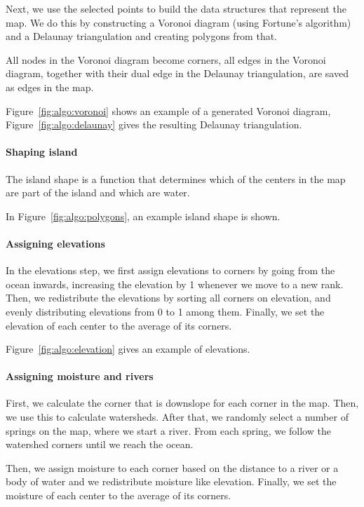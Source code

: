 Next, we use the selected points to build the data structures that represent the map.
We do this by constructing a Voronoi diagram (using Fortune's algorithm) and a Delaunay triangulation and creating polygons from that.

All nodes in the Voronoi diagram become corners, all edges in the Voronoi diagram, together with their dual edge in the Delaunay triangulation, are saved as edges in the map.

Figure~\ref{fig:algo:voronoi} shows an example of a generated Voronoi diagram, Figure~\ref{fig:algo:delaunay} gives the resulting Delaunay triangulation.

\paragraph{Shaping island}

The island shape is a function that determines which of the centers in the map are part of the island and which are water.

In Figure~\ref{fig:algo:polygons}, an example island shape is shown.

\paragraph{Assigning elevations}

In the elevations step, we first assign elevations to corners by going from the ocean inwards, increasing the elevation by 1 whenever we move to a new rank.
Then, we redistribute the elevations by sorting all corners on elevation, and evenly distributing elevations from 0 to 1 among them.
Finally, we set the elevation of each center to the average of its corners.

Figure~\ref{fig:algo:elevation} gives an example of elevations.

\paragraph{Assigning moisture and rivers}

First, we calculate the corner that is downslope for each corner in the map.
Then, we use this to calculate watersheds.
After that, we randomly select a number of springs on the map, where we start a river.
From each spring, we follow the watershed corners until we reach the ocean.

Then, we assign moisture to each corner based on the distance to a river or a body of water and we redistribute moisture like elevation.
Finally, we set the moisture of each center to the average of its corners.


